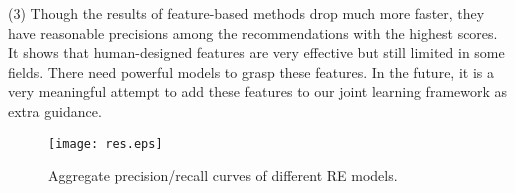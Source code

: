 \documentclass[letterpaper]{article} %
\begin{document}
(3) Though the results of feature-based methods drop much more faster, they have reasonable precisions among the recommendations with the highest scores. It shows that human-designed features are very effective but still limited in some fields. There need powerful models to grasp these features. In the future, it is a very meaningful attempt to add these features to our joint learning framework as extra guidance.

\begin{figure}[t]
\centering
\texttt{[image: res.eps]}
\caption{Aggregate precision/recall curves of different RE models.}
\label{fig:jointcnn}
\end{figure} 


\begin{table}[t]
\centering
{}
\caption{Evaluation results on P@N with different model combination (\%).}
\label{t:relationExt}
\end{table}
\end{document}
